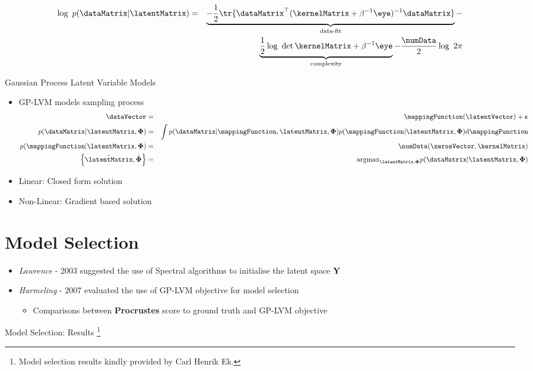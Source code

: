 \begin{eqnarray*}
\log~p(\dataMatrix|\latentMatrix) & = & \underbrace{-\frac{1}{2}\tr{\dataMatrix^{\top}(\kernelMatrix+\beta^{-1}\eye)^{-1}\dataMatrix}}_{\text{data-fit}}-\\
 &  & \underbrace{\frac{1}{2}\log~\det{\kernelMatrix+\beta^{-1}\eye}}_{\text{complexity}}-\frac{\numData}{2}\log~2\pi
\end{eqnarray*}


Gaussian Process Latent Variable Models
\begin{itemize}
\item GP-LVM models sampling process \begin{eqnarray*}
\dataVector & = & \mappingFunction(\latentVector)+\boldsymbol{\epsilon}\\
p(\dataMatrix|\latentMatrix,\boldsymbol{\Phi}) & = & \int p(\dataMatrix|\mappingFunction,\latentMatrix,\boldsymbol{\Phi})p(\mappingFunction|\latentMatrix,\boldsymbol{\Phi})\text{d}\mappingFunction\\
p(\mappingFunction|\latentMatrix,\boldsymbol{\Phi}) & = & \mathcal{\numData}(\zerosVector,\kernelMatrix)\\
\left\{ \hat{\latentMatrix},\hat{\boldsymbol{\Phi}}\right\}  & = & \text{argmax}_{\latentMatrix,\boldsymbol{\Phi}}p(\dataMatrix|\latentMatrix,\boldsymbol{\Phi})\end{eqnarray*}
 
\item Linear: Closed form solution 
\item Non-Linear: Gradient based solution 
\end{itemize}

\section{Model Selection}
\begin{itemize}
\item \emph{Lawrence} - 2003 suggested the use of Spectral algorithms to
initialise the latent space \textbf{Y} 
\item \emph{Harmeling} - 2007 evaluated the use of GP-LVM objective for
model selection 

\begin{itemize}
\item Comparisons between \textbf{Procrustes} score to ground truth and
GP-LVM objective 
\end{itemize}
\end{itemize}
Model Selection: Results%
\footnote{Model selection results kindly provided by Carl Henrik Ek.%
}

